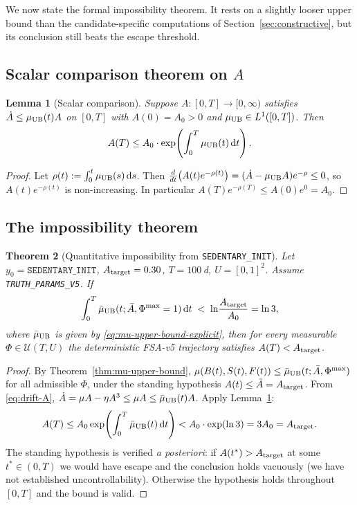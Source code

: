 \documentclass[11pt,a4paper]{article}
\newtheorem{theorem}{Theorem}
\newtheorem{lemma}[theorem]{Lemma}
\theoremstyle{definition}
\newcommand{\dd}{\,\mathrm{d}}
\begin{document}
We now state the formal impossibility theorem. It rests on a slightly looser upper bound than the candidate-specific computations of Section~\ref{sec:constructive}, but its conclusion still beats the escape threshold.

\subsection{Scalar comparison theorem on $A$}

\begin{lemma}[Scalar comparison] \label{lem:scalar-comparison}
Suppose $A: [0,T] \to [0, \infty)$ satisfies $\dot A \le \mu_{\rm UB}(t) A$ on $[0, T]$ with $A(0) = A_0 > 0$ and $\mu_{\rm UB} \in L^1([0,T])$. Then
\[
A(T) \le A_0 \cdot \exp\!\left( \int_0^T \mu_{\rm UB}(t) \dd t \right).
\]
\end{lemma}

\begin{proof}
Let $\rho(t) := \int_0^t \mu_{\rm UB}(s) \dd s$. Then $\frac{d}{dt}\big(A(t) e^{-\rho(t)}\big) = (\dot A - \mu_{\rm UB} A) e^{-\rho} \le 0$, so $A(t) e^{-\rho(t)}$ is non-increasing. In particular $A(T) e^{-\rho(T)} \le A(0) e^0 = A_0$.
\end{proof}

\subsection{The impossibility theorem}

\begin{theorem}[Quantitative impossibility from \texttt{SEDENTARY\_INIT}] \label{thm:impossibility}
Let $y_0 = \texttt{SEDENTARY\_INIT}$, $A_{\rm target} = 0.30$, $T = 100$\,d, $U = [0,1]^2$. Assume \texttt{TRUTH\_PARAMS\_V5}. If
\begin{equation}
\int_0^T \bar\mu_{\rm UB}(t; \bar A, \Phi^{\max} = 1) \dd t \;<\; \ln\!\frac{A_{\rm target}}{A_0} = \ln 3,
\label{eq:impossibility-condition}
\end{equation}
where $\bar\mu_{\rm UB}$ is given by \eqref{eq:mu-upper-bound-explicit}, then for every measurable $\Phi \in \mathcal{U}(T, U)$ the deterministic FSA-v5 trajectory satisfies $A(T) < A_{\rm target}$.
\end{theorem}

\begin{proof}
By Theorem~\ref{thm:mu-upper-bound}, $\mu(B(t), S(t), F(t)) \le \bar\mu_{\rm UB}(t; \bar A, \Phi^{\max})$ for all admissible $\Phi$, under the standing hypothesis $A(t) \le \bar A = A_{\rm target}$. From \eqref{eq:drift-A}, $\dot A = \mu A - \eta A^3 \le \mu A \le \bar\mu_{\rm UB}(t) A$. Apply Lemma~\ref{lem:scalar-comparison}:
\[
A(T) \le A_0 \exp\!\left(\int_0^T \bar\mu_{\rm UB}(t)\dd t\right) < A_0 \cdot \exp(\ln 3) = 3 A_0 = A_{\rm target}.
\]
The standing hypothesis is verified \emph{a posteriori}: if $A(t^*) > A_{\rm target}$ at some $t^* \in (0, T)$ we would have escape and the conclusion holds vacuously (we have not established uncontrollability). Otherwise the hypothesis holds throughout $[0, T]$ and the bound is valid.
\end{proof}
\end{document}
